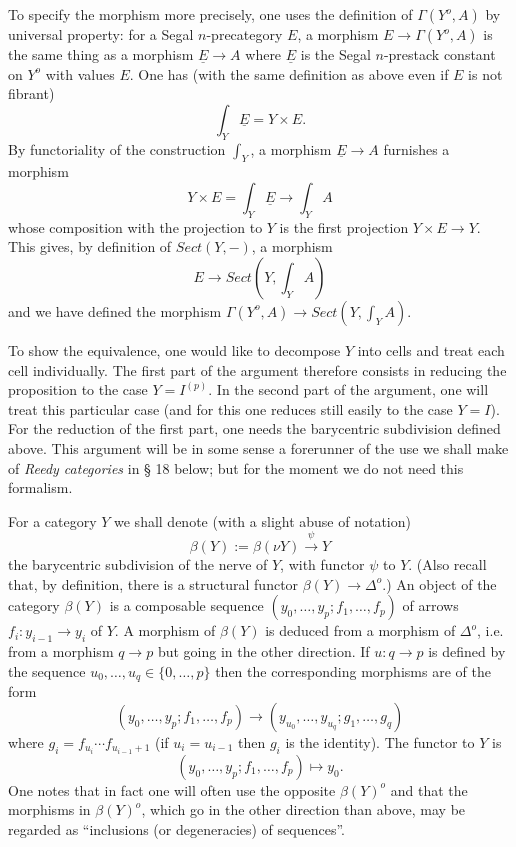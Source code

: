 To specify the morphism more precisely, one uses the definition of
$\Gamma (Y^o, A)$ by universal property: for a Segal $n$-precategory
$E$, a morphism $E\rightarrow \Gamma (Y^o , A)$ is the same thing as a
morphism $\underline{E}\rightarrow A$ where $\underline{E}$ is the
Segal $n$-prestack constant on $Y^o$ with values $E$. One has (with the same
definition as above even if $E$ is not fibrant)
$$
\int _Y\underline{E} = Y\times E.
$$
By functoriality of the construction $\int _Y$, a morphism
$\underline{E}\rightarrow A$ furnishes a morphism
$$
Y\times E =\int _Y\underline{E} \rightarrow \int _YA
$$
whose composition with the projection to $Y$ is the first projection
$Y\times E\rightarrow Y$. This gives, by definition of $Sect (Y, -)$, a
morphism
$$
E\rightarrow Sect (Y, \int _YA)
$$
and we have defined the morphism $\Gamma (Y^o, A)\rightarrow Sect (Y, \int _YA)$.


To show the equivalence,
one would like to decompose $Y$ into cells and treat each cell
individually. The first part of the argument therefore consists in reducing
the proposition to the case $Y=I^{(p)}$. In the second part of the argument,
one will treat this particular case (and for this one reduces still easily
to the case
$Y=I$). For the reduction of the first part, one needs the
barycentric
subdivision defined above. This argument will be in some sense a
forerunner of the use we shall make of {\em Reedy categories} in \S
18 below; but for the moment we do not need this formalism.

For a category $Y$ we shall denote (with a slight abuse of notation)
$$
\beta (Y):= \beta (\nu Y)\stackrel{\psi}{\rightarrow} Y
$$
the barycentric subdivision of the nerve of $Y$, with functor $\psi$ to $Y$.
(Also recall that, by definition, there is a structural functor
$\beta (Y)\rightarrow \Delta ^o$.) An
object of the category $\beta (Y)$ is a composable sequence $(y_0,\ldots , y_p;
f_1,\ldots , f_p)$ of arrows $f_i: y_{i-1}\rightarrow y_i$ of $Y$.
A morphism of $\beta (Y)$ is deduced from a morphism of $\Delta ^o$, i.e. from a
morphism $q\rightarrow p$ but going in the other direction.
If $u: q\rightarrow p$ is defined by the sequence $u_0,\ldots , u_q\in \{
0,\ldots , p\}$ then the corresponding morphisms are of the form
$$
(y_0,\ldots , y_p;
f_1,\ldots , f_p)\rightarrow (y_{u_0}, \ldots , y_{u_q};
g_1, \ldots , g_q)
$$
where $g_i = f_{u_i} \cdots f_{u_{i-1}+1}$ (if $u_i=u_{i-1}$ then $g_i$ is
the identity). The functor to $Y$ is
$$
(y_0,\ldots , y_p;
f_1,\ldots , f_p)\mapsto y_0.
$$
One notes that in fact one will often use the opposite $\beta (Y)^o$ and that
the morphisms in $\beta (Y)^o$, which go in the other direction than above,
may be regarded as ``inclusions (or degeneracies)
of sequences''.

